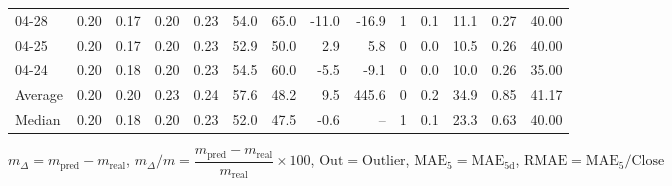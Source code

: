 \begin{threeparttable}
{\begin{tabular}{lrrrrrrrrrrrrr}
  04-28 &          0.20 &          0.17 &          0.20 &        0.23 &                54.0 &                65.0 &      -11.0 &        -16.9 &              1 &                 0.1 &             11.1 &            0.27 &                  40.00 \\
  04-25 &          0.20 &          0.17 &          0.20 &        0.23 &                52.9 &                50.0 &        2.9 &          5.8 &              0 &                 0.0 &             10.5 &            0.26 &                  40.00 \\
  04-24 &          0.20 &          0.18 &          0.20 &        0.23 &                54.5 &                60.0 &       -5.5 &         -9.1 &              0 &                 0.0 &             10.0 &            0.26 &                  35.00 \\
Average &          0.20 &          0.20 &          0.23 &        0.24 &                57.6 &                48.2 &        9.5 &        445.6 &              0 &                 0.2 &             34.9 &            0.85 &                  41.17 \\
 Median &          0.20 &          0.18 &          0.20 &        0.23 &                52.0 &                47.5 &       -0.6 &           -- &              1 &                 0.1 &             23.3 &            0.63 &                  40.00 \\
\bottomrule
\end{tabular}
}
\begin{tablenotes}\footnotesize
\item $m_\Delta=m_{\text{pred}}-m_{\text{real}}$,
$m_\Delta/m=\dfrac{m_{\text{pred}}-m_{\text{real}}}{m_{\text{real}}}\times100$,
$\mathrm{Out}=\text{Outlier}$,
$\mathrm{MAE}_5=\mathrm{MAE}_{5\text{d}}$,
$\mathrm{RMAE}=\mathrm{MAE}_5/\text{Close}$
\end{tablenotes}
\end{threeparttable}
\endgroup

